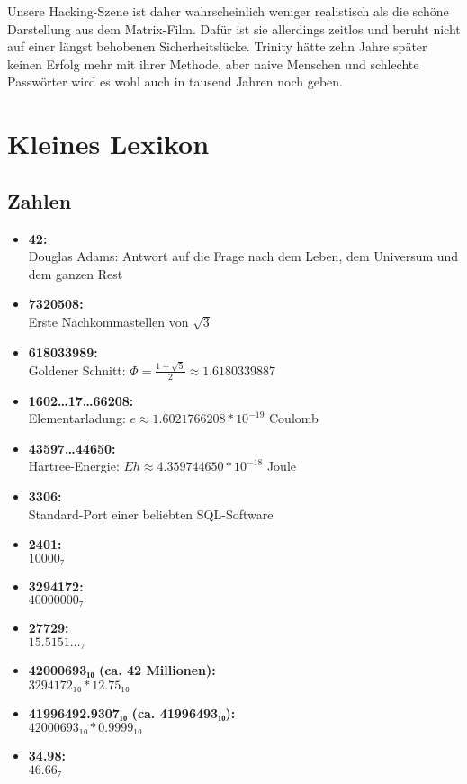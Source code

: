 Unsere Hacking-Szene ist daher wahrscheinlich weniger realistisch als die schöne Darstellung aus dem Matrix-Film. Dafür ist sie allerdings zeitlos und beruht nicht auf einer längst behobenen Sicherheitslücke. Trinity hätte zehn Jahre später keinen Erfolg mehr mit ihrer Methode, aber naive Menschen und schlechte Passwörter wird es wohl auch in tausend Jahren noch geben.

\chapter{Kleines Lexikon}

\section{Zahlen}

\begin{itemize}
	\item \textbf{42:}\\ Douglas Adams: Antwort auf die Frage nach dem Leben, dem Universum und dem ganzen Rest
	\item \textbf{7320508:}\\ Erste Nachkommastellen von $\sqrt{3}$
	\item \textbf{618033989:}\\ Goldener Schnitt: $Φ = \frac{1+\sqrt{5}}{2} ≈ 1.6180339887$
	\item \textbf{1602…17…66208:}\\ Elementarladung: $e ≈ 1.6021766208*10^{-19}$ Coulomb
	\item \textbf{43597…44650:}\\ Hartree-Energie: $Eh ≈ 4.359744650*10^{-18}$ Joule
	\item \textbf{3306:}\\ Standard-Port einer beliebten SQL-Software
	\item \textbf{2401:}\\ $10000₇$
	\item \textbf{3294172:}\\ $40000000₇$
	\item \textbf{27729:}\\ $15.5151…₇$
	\item \textbf{42000693₁₀ (ca. 42 Millionen):}\\ $3294172₁₀*12.75₁₀$
	\item \textbf{41996492.9307₁₀ (ca. 41996493₁₀):}\\ $42000693₁₀*0.9999₁₀$
	\item \textbf{34.98:}\\ $46.66₇$

\end{itemize}
